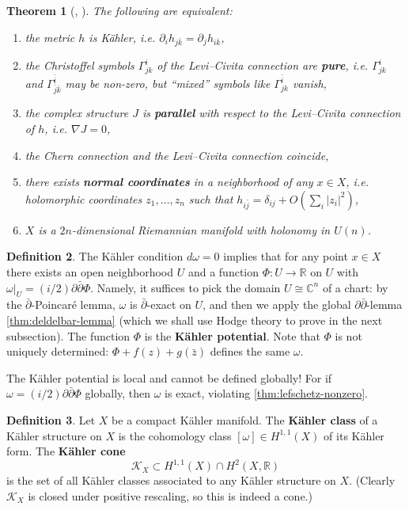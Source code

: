 \documentclass{report}
\theoremstyle{plain}
\newtheorem{theorem}{Theorem}[section]
\theoremstyle{definition}
\newtheorem{definition}[theorem]{Definition}
\theoremstyle{remark}
\newcommand{\di}{\partial}
\newcommand{\bC}{\mathbb{C}}
\newcommand{\bR}{\mathbb{R}}
\newcommand{\cK}{\mathcal{K}}
\newcommand{\bz}{\bar{z}}
\newcommand{\bdi}{\bar{\di}}
\begin{document}
\begin{theorem}[{\cite[Theorem 3.13, Proposition 3.14]{Voisin2002}}, {\cite[Proposition 4.A.17]{Huybrechts2005}}] \label{thm:kahler-defs}
  The following are equivalent:
  \begin{enumerate}
  \item the metric $h$ is K\"ahler, i.e. $\di_i h_{j\bar{k}} = \di_j
    h_{i\bar{k}}$,
  \item the Christoffel symbols $\Gamma^i_{jk}$ of the Levi--Civita
    connection are {\bf pure}, i.e. $\Gamma^i_{jk}$ and
    $\Gamma^{\bar{i}}_{\bar{j}\bar{k}}$ may be non-zero, but ``mixed''
    symbols like $\Gamma^{\bar{i}}_{jk}$ vanish,
  \item the complex structure $J$ is {\bf parallel} with respect to
    the Levi--Civita connection of $h$, i.e. $\nabla J = 0$,
  \item the Chern connection and the Levi--Civita connection coincide,
  \item there exists {\bf normal coordinates} in a neighborhood of any
    $x \in X$, i.e. holomorphic coordinates $z_1, \ldots, z_n$ such
    that $h_{i\bar{j}} = \delta_{ij} + O(\sum_i |z_i|^2)$,
  \item $X$ is a $2n$-dimensional Riemannian manifold with holonomy in
    $U(n)$.
  \end{enumerate}
\end{theorem}

\begin{definition}
  The K\"ahler condition $d\omega = 0$ implies that for any point $x
  \in X$ there exists an open neighborhood $U$ and a function
  $\Phi\colon U \to \bR$ on $U$ with $\omega|_U = (i/2)\di\bdi\Phi$.
  Namely, it suffices to pick the domain $U \cong \bC^n$ of a chart:
  by the $\bdi$-Poincar\'e lemma, $\omega$ is $\bdi$-exact on $U$, and
  then we apply the global $\di\bdi$-lemma \ref{thm:deldelbar-lemma}
  (which we shall use Hodge theory to prove in the next subsection).
  The function $\Phi$ is the {\bf K\"ahler potential}. Note that
  $\Phi$ is not uniquely determined: $\Phi + f(z) + g(\bz)$ defines
  the same $\omega$.
\end{definition}

The K\"ahler potential is local and cannot be defined globally! For if
$\omega = (i/2)\di\bdi\Phi$ globally, then $\omega$ is exact,
violating \ref{thm:lefschetz-nonzero}.

\begin{definition}
  Let $X$ be a compact K\"ahler manifold. The {\bf K\"ahler class} of
  a K\"ahler structure on $X$ is the cohomology class $[\omega] \in
  H^{1,1}(X)$ of its K\"ahler form. The {\bf K\"ahler cone}
  \[ \cK_X \subset H^{1,1}(X) \cap H^2(X, \bR) \]
  is the set of all K\"ahler classes associated to any K\"ahler
  structure on $X$. (Clearly $\cK_X$ is closed under positive
  rescaling, so this is indeed a cone.)
\end{definition}
\end{document}
